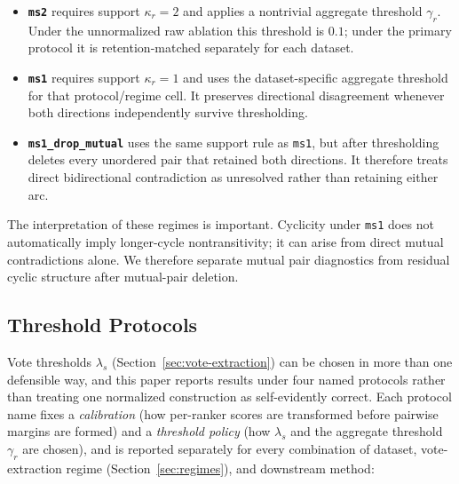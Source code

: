 \documentclass[manuscript,anonymous,review]{acmart}
\begin{document}
\begin{itemize}
  \item \textbf{\texttt{ms2}} requires support $\kappa_r=2$ and applies a
    nontrivial aggregate threshold $\gamma_r$. Under the unnormalized raw
    ablation this threshold is $0.1$; under the primary protocol it is
    retention-matched separately for each dataset.
  \item \textbf{\texttt{ms1}} requires support $\kappa_r=1$ and uses the
    dataset-specific aggregate threshold for that protocol/regime cell. It
    preserves directional disagreement whenever both directions independently
    survive thresholding.
  \item \textbf{\texttt{ms1\_drop\_mutual}} uses the same support rule as
    \texttt{ms1}, but after thresholding deletes every unordered pair that
    retained both directions. It therefore treats direct bidirectional
    contradiction as unresolved rather than retaining either arc.
\end{itemize}

The interpretation of these regimes is important. Cyclicity under
\texttt{ms1} does not automatically imply longer-cycle nontransitivity; it can
arise from direct mutual contradictions alone. We therefore separate mutual
pair diagnostics from residual cyclic structure after mutual-pair deletion.

\subsection{Threshold Protocols}
\label{sec:threshold-protocols}

Vote thresholds $\lambda_s$ (Section~\ref{sec:vote-extraction}) can be chosen
in more than one defensible way, and this paper reports results under four
named protocols rather than treating one normalized construction as
self-evidently correct. Each protocol name fixes a \emph{calibration}
(how per-ranker scores are transformed before pairwise margins are formed)
and a \emph{threshold policy} (how $\lambda_s$ and the aggregate threshold
$\gamma_r$ are chosen), and is reported separately for every combination of
dataset, vote-extraction regime (Section~\ref{sec:regimes}), and downstream
method:
\end{document}
